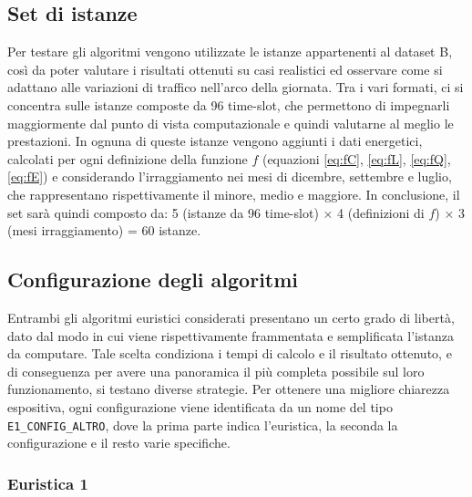 \subsection{Set di istanze}

Per testare gli algoritmi vengono utilizzate le istanze appartenenti al dataset B, così da poter valutare i risultati ottenuti su casi realistici ed osservare come si adattano alle variazioni di traffico nell'arco della giornata. Tra i vari formati, ci si concentra sulle istanze composte da 96 time-slot, che permettono di impegnarli maggiormente dal punto di vista computazionale e quindi valutarne al meglio le prestazioni. In ognuna di queste istanze vengono aggiunti i dati energetici, calcolati per ogni definizione della funzione $f$ (equazioni \ref{eq:fC}, \ref{eq:fL}, \ref{eq:fQ}, \ref{eq:fE}) e considerando l'irraggiamento nei mesi di dicembre, settembre e luglio, che rappresentano rispettivamente il minore, medio e maggiore. In conclusione, il set sarà quindi composto da: 5 (istanze da 96 time-slot) $\times$ 4 (definizioni di $f$) $\times$ 3 (mesi irraggiamento) = 60 istanze.

\subsection{Configurazione degli algoritmi}

Entrambi gli algoritmi euristici considerati presentano un certo grado di libertà, dato dal modo in cui viene rispettivamente frammentata e semplificata l'istanza da computare. Tale scelta condiziona i tempi di calcolo e il risultato ottenuto, e di conseguenza per avere una panoramica il più completa possibile sul loro funzionamento, si testano diverse strategie. Per ottenere una migliore chiarezza espositiva, ogni configurazione viene identificata da un nome del tipo \texttt{E1\_CONFIG\_ALTRO}, dove la prima parte indica l'euristica, la seconda la configurazione e il resto varie specifiche.

\subsubsection{Euristica 1}

